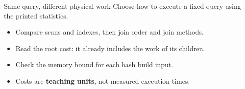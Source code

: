 \begin{frame}[t]{Same query, different physical work}
Choose how to execute a fixed query using the printed statistics.
\medskip
\begin{itemize}
\item Compare scans and indexes, then join order and join methods.
\item Read the root cost: it already includes the work of its children.
\item Check the memory bound for each hash build input.
\item Costs are \textbf{teaching units}, not measured execution times.
\end{itemize}
\end{frame}
